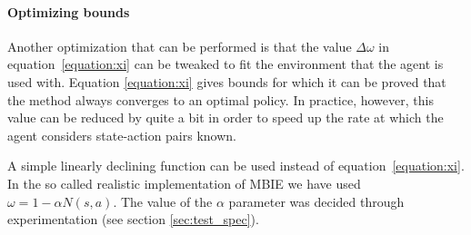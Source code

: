 \paragraph{Optimizing bounds} Another optimization that can be performed is that the value $\Delta \omega$ in
equation~\eqref{equation:xi} can be tweaked to fit the environment that the agent
is used with. Equation \eqref{equation:xi} gives bounds for which it can be
proved that the method always converges to an optimal policy. In practice,
however, this value can be reduced by quite a bit in order to speed up the rate
at which the agent considers state-action pairs known. 

A simple linearly declining function can be used instead of
equation~\eqref{equation:xi}. In the so called realistic implementation of MBIE we have
used $\omega = 1 - \alpha N(s,a).$ The value of the $\alpha$ parameter was decided through experimentation (see section \ref{sec:test_spec}).

